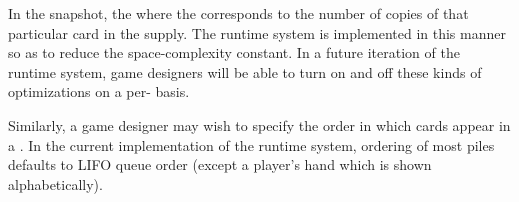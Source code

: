 In the snapshot, the  where
the  corresponds to the number of copies of
that particular card in the supply. The runtime system is implemented in
this manner so as to reduce the space-complexity constant. In a future
iteration of the runtime system, game designers will be
able to turn on and off these kinds of optimizations on a
per- basis.

Similarly, a game designer may wish to specify the order in which cards
appear in a . In the current implementation
of the runtime system, ordering of most piles defaults to LIFO queue
order (except a player's hand which is shown alphabetically).


